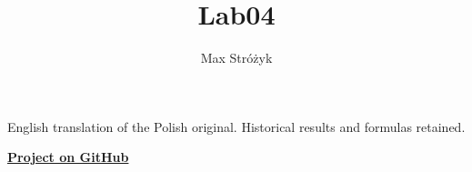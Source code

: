 \documentclass[a4paper, 11pt]{article}
\title{Lab04}
\author{Max Stróżyk}
\begin{document}
\maketitle
\begin{center}\small English translation of the Polish original. Historical results and formulas retained.\end{center}
\tableofcontents
\begin{center}
    \href{https://github.com/maxi7524/coursework/tree/main/courses/numerical-methods/assignments/lab-04}{\textbf{Project on GitHub}}
\end{center}



\newpage




\newpage



\newpage




\newpage


\end{document}
